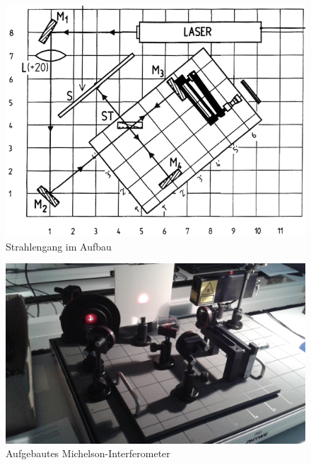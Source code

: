 \documentclass[a4paper, 11pt]{article}
\begin{document}
\begin{figure}[H]
	\centering
	\includegraphics[trim = 0mm 0mm 0mm 0mm,clip, width=12cm]{Bilder/aufbau_optik2.png}%
	\caption[Strahlengang im Aufbau]{Strahlengang im Aufbau}%
	\label{pic:Abbildung 1}%
\end{figure}

\begin{figure}[H]
	\centering
	\includegraphics[scale=0.25]{Bilder/Aufbau.jpg}%
	\caption{Aufgebautes Michelson-Interferometer}%
	\label{pic:Michelson}%
\end{figure}
\end{document}
